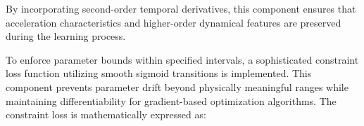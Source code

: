 \documentclass[11pt, oneside]{article}
\begin{document}
By incorporating second-order temporal derivatives, this component ensures that acceleration characteristics and higher-order dynamical features are preserved during the learning process.





To enforce parameter bounds within specified intervals, a sophisticated constraint loss function utilizing smooth sigmoid transitions is implemented. This component prevents parameter drift beyond physically meaningful ranges while maintaining differentiability for gradient-based optimization algorithms. The constraint loss is mathematically expressed as:
\end{document}
